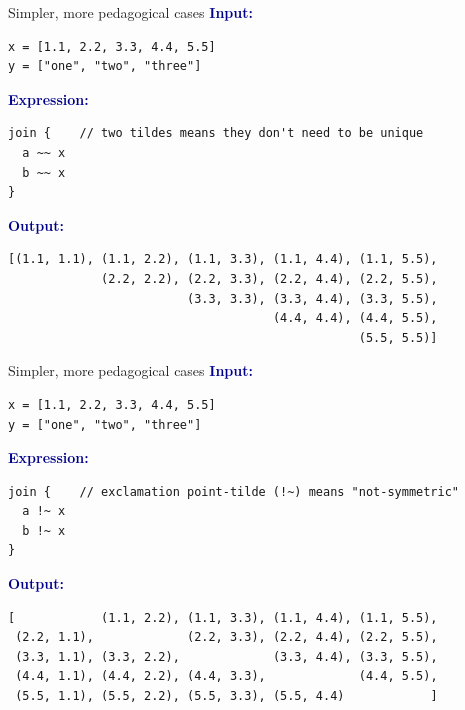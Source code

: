 \documentclass[aspectratio=169]{beamer}
\begin{document}
\begin{frame}[fragile]{Simpler, more pedagogical cases}
\vspace{0.25 cm}
\textcolor{darkblue}{\large\bf Input:}

\begin{verbatim}
x = [1.1, 2.2, 3.3, 4.4, 5.5]
y = ["one", "two", "three"]
\end{verbatim}

\vspace{0.25 cm}
\textcolor{darkblue}{\large\bf Expression:}

\begin{verbatim}
join {    // two tildes means they don't need to be unique
  a ~~ x
  b ~~ x
}
\end{verbatim}

\vspace{0.25 cm}
\textcolor{darkblue}{\large\bf Output:}

\begin{verbatim}
[(1.1, 1.1), (1.1, 2.2), (1.1, 3.3), (1.1, 4.4), (1.1, 5.5),
             (2.2, 2.2), (2.2, 3.3), (2.2, 4.4), (2.2, 5.5),
                         (3.3, 3.3), (3.3, 4.4), (3.3, 5.5),
                                     (4.4, 4.4), (4.4, 5.5),
                                                 (5.5, 5.5)]
\end{verbatim}
\end{frame}

\begin{frame}[fragile]{Simpler, more pedagogical cases}
\vspace{0.25 cm}
\textcolor{darkblue}{\large\bf Input:}

\begin{verbatim}
x = [1.1, 2.2, 3.3, 4.4, 5.5]
y = ["one", "two", "three"]
\end{verbatim}

\vspace{0.25 cm}
\textcolor{darkblue}{\large\bf Expression:}

\begin{verbatim}
join {    // exclamation point-tilde (!~) means "not-symmetric"
  a !~ x
  b !~ x
}
\end{verbatim}

\vspace{0.25 cm}
\textcolor{darkblue}{\large\bf Output:}
\begin{verbatim}
[            (1.1, 2.2), (1.1, 3.3), (1.1, 4.4), (1.1, 5.5),
 (2.2, 1.1),             (2.2, 3.3), (2.2, 4.4), (2.2, 5.5),
 (3.3, 1.1), (3.3, 2.2),             (3.3, 4.4), (3.3, 5.5),
 (4.4, 1.1), (4.4, 2.2), (4.4, 3.3),             (4.4, 5.5),
 (5.5, 1.1), (5.5, 2.2), (5.5, 3.3), (5.5, 4.4)            ]
\end{verbatim}
\end{frame}
\end{document}
